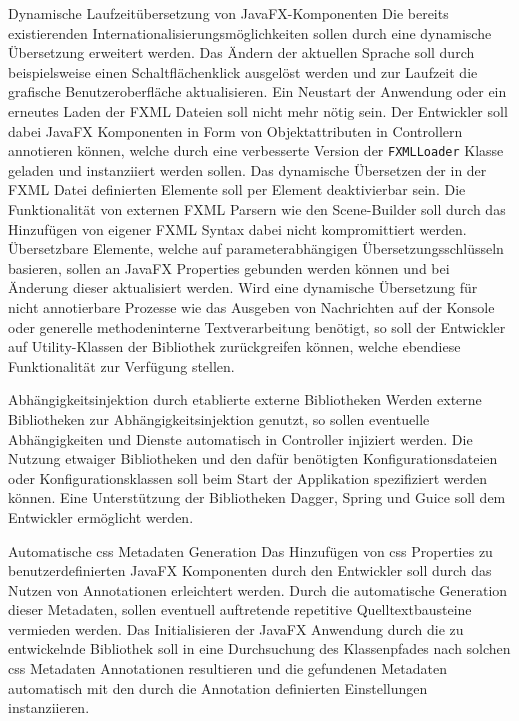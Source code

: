 \begin{freq}{Dynamische Laufzeitübersetzung von JavaFX-Komponenten}
	Die bereits existierenden Internationalisierungsmöglichkeiten sollen durch eine dynamische Übersetzung erweitert werden. Das Ändern der aktuellen Sprache soll durch beispielsweise einen Schaltflächenklick ausgelöst werden und zur Laufzeit die grafische Benutzeroberfläche aktualisieren. Ein Neustart der Anwendung oder ein erneutes Laden der FXML Dateien soll nicht mehr nötig sein. Der Entwickler soll dabei JavaFX Komponenten in Form von Objektattributen in Controllern annotieren können, welche durch eine verbesserte Version der \texttt{FXMLLoader} Klasse geladen und instanziiert werden sollen. Das dynamische Übersetzen der in der FXML Datei definierten Elemente soll per Element deaktivierbar sein. Die Funktionalität von externen FXML Parsern wie den Scene-Builder soll durch das Hinzufügen von eigener FXML Syntax dabei nicht kompromittiert werden. Übersetzbare Elemente, welche auf parameterabhängigen Übersetzungsschlüsseln basieren, sollen an JavaFX Properties gebunden werden können und bei Änderung dieser aktualisiert werden. Wird eine dynamische Übersetzung für nicht annotierbare Prozesse wie das Ausgeben von Nachrichten auf der Konsole oder generelle methodeninterne Textverarbeitung benötigt, so soll der Entwickler auf Utility-Klassen der Bibliothek zurückgreifen können, welche ebendiese Funktionalität zur Verfügung stellen.
\end{freq}
\begin{freq}{Abhängigkeitsinjektion durch etablierte externe Bibliotheken}
	Werden externe Bibliotheken zur Abhängigkeitsinjektion genutzt, so sollen eventuelle Abhängigkeiten und Dienste automatisch in Controller injiziert werden. Die Nutzung etwaiger Bibliotheken und den dafür benötigten Konfigurationsdateien oder Konfigurationsklassen soll beim Start der Applikation spezifiziert werden können. Eine Unterstützung der Bibliotheken Dagger, Spring und Guice soll dem Entwickler ermöglicht werden.
\end{freq}
\begin{freq}{Automatische \ac{css} Metadaten Generation}
	Das Hinzufügen von \ac{css} Properties zu benutzerdefinierten JavaFX Komponenten durch den Entwickler soll durch das Nutzen von Annotationen erleichtert werden. Durch die automatische Generation dieser Metadaten, sollen eventuell auftretende repetitive Quelltextbausteine vermieden werden. Das Initialisieren der JavaFX Anwendung durch die zu entwickelnde Bibliothek soll in eine Durchsuchung des Klassenpfades nach solchen \ac{css} Metadaten Annotationen resultieren und die gefundenen Metadaten automatisch mit den durch die Annotation definierten Einstellungen instanziieren.
\end{freq}
